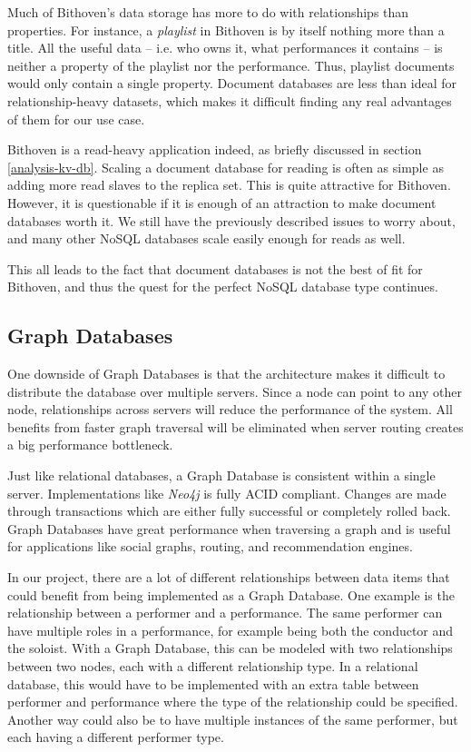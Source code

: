 Much of Bithoven's data storage has more to do with relationships than
properties. For instance, a \emph{playlist} in Bithoven is by itself nothing
more than a title. All the useful data -- i.e. who owns it, what performances it
contains -- is neither a property of the playlist nor the performance. Thus,
playlist documents would only contain a single property. Document databases are
less than ideal for relationship-heavy datasets, which makes it difficult
finding any real advantages of them for our use case.

Bithoven is a read-heavy application indeed, as briefly discussed in section
\ref{analysis-kv-db}. Scaling a document database for reading is often as simple
as adding more read slaves to the replica set. This is quite attractive for
Bithoven. However, it is questionable if it is enough of an attraction to make
document databases worth it. We still have the previously described issues to
worry about, and many other NoSQL databases scale easily enough for reads as
well.

This all leads to the fact that document databases is not the best of fit for
Bithoven, and thus the quest for the perfect NoSQL database type continues.

\subsection{Graph Databases}
\label{analysis-graph-db}

One downside of Graph Databases is that the architecture makes it difficult to distribute the database over multiple servers. Since a node can point to any other node, relationships across servers will reduce the performance of the system. All benefits from faster graph traversal will be eliminated when server routing creates a big performance bottleneck.

Just like relational databases, a Graph Database is consistent within a single server. Implementations like \emph{Neo4j} is fully ACID compliant. Changes are made through transactions which are either fully successful or completely rolled back. Graph Databases have great performance when traversing a graph and is useful for applications like social graphs, routing, and recommendation engines.

In our project, there are a lot of different relationships between data items that could benefit from being implemented as a Graph Database. One example is the relationship between a performer and a performance. The same performer can have multiple roles in a performance, for example being both the conductor and the soloist. With a Graph Database, this can be modeled with two relationships between two nodes, each with a different relationship type. In a relational database, this would have to be implemented with an extra table between performer and performance where the type of the relationship could be specified. Another way could also be to have multiple instances of the same performer, but each having a different performer type.

